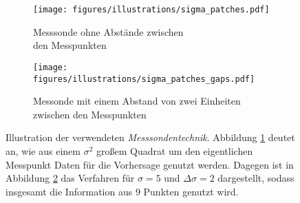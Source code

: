 \begin{figure}[h]
\centering
\begin{subfigure}{.5\textwidth}
  \centering
  \texttt{[image: figures/illustrations/sigma\_patches.pdf]}
  \caption{Messsonde ohne Abstände zwischen\\den Messpunkten}
  \label{fig:probe_illustration_no_gaps}
\end{subfigure}%
\begin{subfigure}{.5\textwidth}
  \centering
  \texttt{[image: figures/illustrations/sigma\_patches\_gaps.pdf]}
  \caption{Messonde mit einem Abstand von zwei Einheiten zwischen den Messpunkten}
  \label{fig:probe_illustration_gaps}
\end{subfigure}
\caption{Illustration der verwendeten \textit{Messsondentechnik}. Abbildung \ref{fig:probe_illustration_no_gaps} deutet an, wie aus einem $\sigma^2$ großem Quadrat um den eigentlichen Messpunkt Daten für die Vorhersage genutzt werden. Dagegen ist in Abbildung \ref{fig:probe_illustration_gaps} das Verfahren für $\sigma=5$ und $\Delta \sigma = 2$ dargestellt, sodass insgesamt die Information aus $9$ Punkten genutzt wird.}
\label{fig:probe_illustration}
\end{figure}

